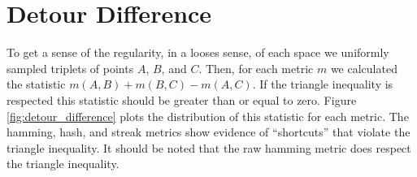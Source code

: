 \section{Detour Difference}



To get a sense of the regularity, in a looses sense, of each space we uniformly sampled triplets of points $A$, $B$, and $C$.
Then, for each metric $m$ we calculated the statistic $m(A, B) + m(B, C) - m(A, C)$.
If the triangle inequality is respected this statistic should be greater than or equal to zero.
Figure \ref{fig:detour_difference} plots the distribution of this statistic for each metric.
The hamming, hash, and streak metrics show evidence of ``shortcuts'' that violate the triangle inequality.
It should be noted that the raw hamming metric does respect the triangle inequality.



